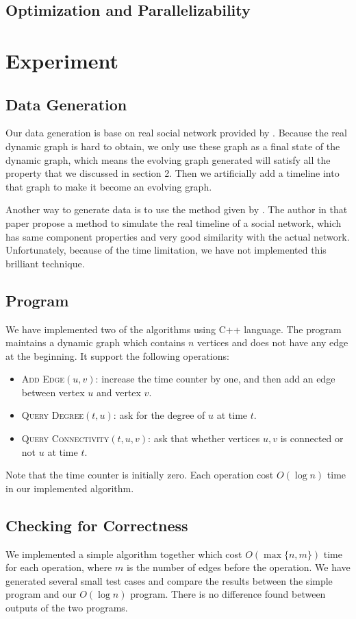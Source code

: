 \documentclass[12pt,abstract=true]{scrartcl}
\numberwithin{equation}{section}
\theoremstyle{definition}   \newtheorem{definition}{Definition}[section]
\theoremstyle{plain}        \newtheorem{theorem}{Theorem}[section]
\theoremstyle{plain}        \newtheorem{observation}{Observation}[section]
\theoremstyle{plain}        \newtheorem{fact}{Fact}[section]
\theoremstyle{plain}        \newtheorem{claim}{Claim}[section]
\theoremstyle{plain}        \newtheorem{lemma}[theorem]{Lemma}
\theoremstyle{plain}        \newtheorem{corollary}[theorem]{Corollary}
\theoremstyle{remark}       \newtheorem{example}{Example}[section]
\theoremstyle{remark}       \newtheorem{remark}{Remark}[section]
\begin{document}
\subsection{Optimization and Parallelizability}
\section{Experiment}
\subsection{Data Generation} 
Our data generation is base on real social network provided by \cite{database1,
database2}.  Because the real dynamic graph is hard to obtain, we only use
these graph as a final state of the dynamic graph, which means the evolving
graph generated will satisfy all the property that we discussed in section 2.
Then we artificially add a timeline into that graph to make it become an
evolving graph.

Another way to generate data is to use the method given by
\cite{kumar2010structure}.  The author in that paper propose a method to
simulate the real timeline of a social network, which has same component
properties and very good similarity with the actual network.  Unfortunately,
because of the time limitation, we have not implemented this brilliant
technique.

\subsection{Program}
We have implemented two of the algorithms using C++ language.
The program maintains a dynamic graph which contains $n$ vertices and does not have
any edge at the beginning.
It support the following operations:
\begin{itemize}
	\item \textsc{Add Edge$(u,v)$:} increase the time counter by one, and then add an edge
		between vertex $u$ and vertex $v$.
	\item \textsc{Query Degree$(t,u)$:} ask for the degree of $u$ at time $t$.
	\item \textsc{Query Connectivity$(t,u,v)$:} ask that whether vertices $u,v$ is connected or not
		$u$ at time $t$.
\end{itemize}
Note that the time counter is initially zero.
Each operation cost $O(\log n)$ time in our implemented algorithm.

\subsection{Checking for Correctness}
We implemented a simple algorithm together which cost $O(\max\{n,m\})$ time for each operation,
	where $m$ is the number of edges before the operation.
We have generated several small test cases and compare the results between the simple program
	and our $O(\log n)$ program.
There is no difference found between outputs of the two programs.
\end{document}
